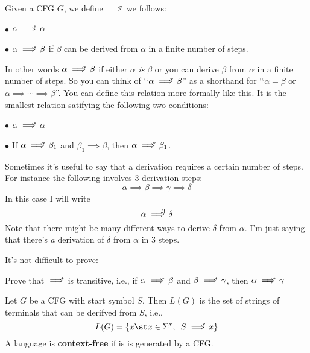 \begin{defn}
Given a CFG $G$, we define $\implies^{\hspace{-0.3cm}*}$ we follows:
\begin{tightlist}
 \item[$\bullet$] $\alpha \implies^{\hspace{-0.3cm}*}\ \alpha$
 \item[$\bullet$] $\alpha \implies^{\hspace{-0.3cm}*}\ \beta$ if $\beta$ can be derived from 
 $\alpha$ in a finite number of steps.
\end{tightlist}
In other words $\alpha \implies^{\hspace{-0.3cm}*}\ \beta$ if either $\alpha$ \textit{ is} $\beta$
or you can derive $\beta$ from $\alpha$ in a finite number of steps.
So you can think of \lq\lq $\alpha \implies^{\hspace{-0.3cm}*}\ \beta$'' as a shorthand
for \lq\lq $\alpha = \beta$ or $\alpha \implies \cdots \implies \beta$''.
You can define this relation more formally like this.
It is the smallest relation satifying the following two conditions:
\begin{tightlist}
 \item[$\bullet$] $\alpha \implies^{\hspace{-0.3cm}*}\ \alpha$
 \item[$\bullet$] If $\alpha \implies^{\hspace{-0.3cm}*}\ \beta_1$ and 
$\beta_1 \implies \beta$, then 
$\alpha \implies^{\hspace{-0.3cm}*}\ \beta_1$.
\end{tightlist}
\end{defn}
Sometimes it's useful to say that a derivation requires a certain number of
steps.
For instance the following involves 3 derivation steps:
\[
\alpha 
\implies
\beta
\implies
\gamma
\implies
\delta
\]
In this case I will write
\[
\alpha 
\implies^{\hspace{-0.3cm} 3}\  
\delta
\]
Note that there might be many different ways to 
derive $\delta$ from $\alpha$.
I'm just saying that there's \textit{a} derivation of
$\delta$ from $\alpha$ in 3 steps. 

It's not difficult to prove:

\begin{ex}
Prove that $\implies^{\hspace{-0.3cm}*}$ is transitive, i.e., if 
$\alpha \implies^{\hspace{-0.3cm}*}\ \beta$
and 
$\beta \implies^{\hspace{-0.3cm}*}\ \gamma$, then
$\alpha \implies^{\hspace{-0.3cm}*}\ \gamma$
\end{ex}

\begin{defn}
Let $G$ be a CFG with start symbol $S$.
Then $L(G)$ is the set of strings of terminals that can be derifved from 
$S$, i.e.,
\[
L(G) = \{x \st x \in \Sigma^*, \,\,\, S \implies^{\hspace{-0.3cm}*}\ x \}
\] 
A language is \textbf{context-free} if is is generated by a CFG.
\end{defn}


